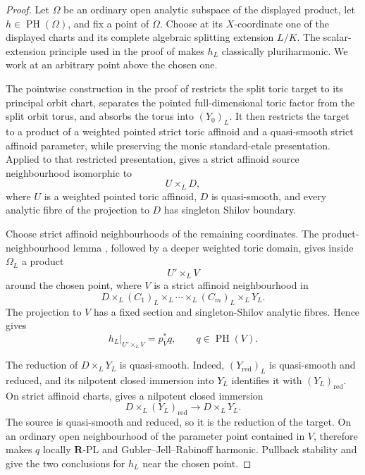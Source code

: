 \begin{proof}
Let $\Omega$ be an ordinary open analytic subspace of the displayed
product, let $h\in\operatorname{PH}(\Omega)$, and fix a point of $\Omega$.
Choose at its $X$-coordinate one of the displayed charts and its complete
algebraic splitting extension $L/K$.  The scalar-extension principle used
in the proof of
 makes $h_L$
classically pluriharmonic.  We work at an arbitrary point above the chosen
one.

The pointwise construction in the proof of
 restricts the split toric
target to its principal orbit chart, separates the pointed
full-dimensional toric factor from the split orbit torus, and absorbs the
torus into $(Y_0)_L$.  It then restricts the target to a product of a
weighted pointed strict toric affinoid and a quasi-smooth strict affinoid
parameter, while preserving the monic standard-etale presentation.  Applied
to that restricted presentation,
 gives a strict
affinoid source neighbourhood isomorphic to
\[
                              U\times_LD,
\]
where $U$ is a weighted pointed toric affinoid, $D$ is quasi-smooth, and
every analytic fibre of the projection to $D$ has singleton Shilov
boundary.

Choose strict affinoid neighbourhoods of the remaining coordinates.  The
product-neighbourhood lemma , followed by
a deeper weighted toric domain, gives inside $\Omega_L$ a product
\[
                              U'\times_LV
\]
around the chosen point, where $V$ is a strict affinoid neighbourhood in
\[
 D\times_L(C_1)_L\times_L\cdots\times_L(C_m)_L\times_LY_L.
\]
The projection to $V$ has a fixed section and singleton-Shilov analytic
fibres.  Hence  gives
\[
                     h_L|_{U'\times_LV}=p_V^*q,
                     \qquad q\in\operatorname{PH}(V).
\]

The reduction of $D\times_LY_L$ is quasi-smooth.  Indeed,
$(Y_{\mathrm{red}})_L$ is quasi-smooth and reduced, and its nilpotent
closed immersion into $Y_L$ identifies it with $(Y_L)_{\mathrm{red}}$.
On strict affinoid charts,
 gives a nilpotent closed immersion
\[
 D\times_L(Y_L)_{\mathrm{red}}\longrightarrow D\times_LY_L.
\]
The source is quasi-smooth and reduced, so it is the reduction of the
target.  On an ordinary open neighbourhood of the parameter point contained
in $V$,  therefore makes $q$
locally $\mathbf R$-PL and Gubler--Jell--Rabinoff harmonic.  Pullback
stability \cite[Lemma~5.4(1)]{GJR26} and
 give the two conclusions for $h_L$
near the chosen point.


\end{proof}
